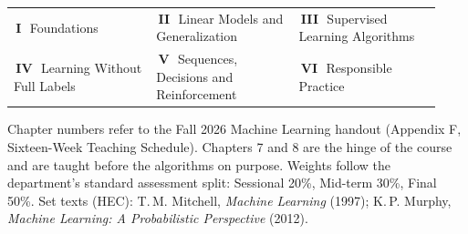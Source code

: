 \documentclass[10pt,a4paper]{article}
\makeatletter
\newcommand{\chipw}[2]{{\setlength{\fboxsep}{1.3pt}\colorbox{#1}{%
  \fontsize{6.4}{7}\selectfont\bfseries\color{white}\,#2\,}}}
\newcommand{\legend}[6]{{\fontsize{6.6}{8}\selectfont\color{sub}%
  \begin{tabular}{@{}p{0.31\linewidth}p{0.31\linewidth}p{0.31\linewidth}@{}}
  \chipw{p1}{I}\ #1 & \chipw{p2}{II}\ #2 & \chipw{p3}{III}\ #3 \\[1pt]
  \chipw{p4}{IV}\ #4 & \chipw{p5}{V}\ #5 & \chipw{p6}{VI}\ #6
  \end{tabular}}}
\makeatother
\begin{document}
\vspace{4pt}
\legend{Foundations}{Linear Models and Generalization}{Supervised Learning Algorithms}
       {Learning Without Full Labels}{Sequences, Decisions and Reinforcement}{Responsible Practice}

\vspace{2pt}
{\fontsize{6.3}{7.6}\selectfont\color{neutral}%
Chapter numbers refer to the Fall 2026 Machine Learning handout (Appendix F, Sixteen-Week Teaching Schedule). Chapters 7 and 8 are the hinge of the course and are taught before the algorithms on purpose.
Weights follow the department's standard assessment split: Sessional 20\%, Mid-term 30\%, Final 50\%. Set texts (HEC): T.\,M. Mitchell, \emph{Machine Learning} (1997); K.\,P. Murphy, \emph{Machine Learning: A Probabilistic Perspective} (2012).\par}
\end{document}

